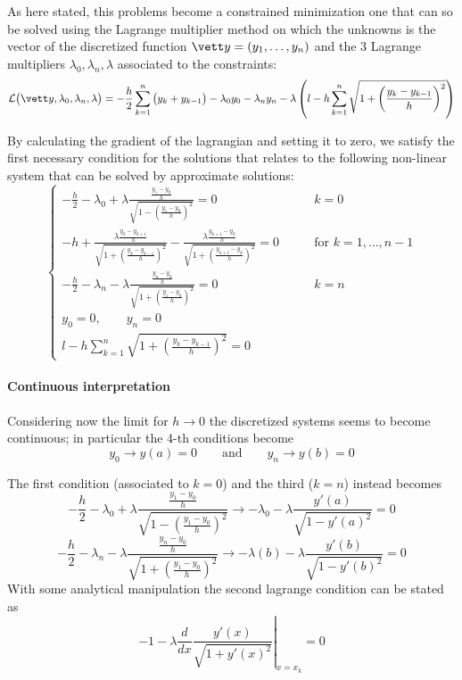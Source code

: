 As here stated, this problems become a constrained minimization one that can so be solved using the Lagrange multiplier method on which the unknowns is the vector of the discretized function $\vett y = (y_1,\dots, y_n)$ and the 3 Lagrange multipliers $\lambda_0,\lambda_n,\lambda$ associated to the constraints:
\[ \mathcal L \big(\vett y,\lambda_0,\lambda_n,\lambda\big) = - \frac h 2 \sum_{k=1}^{n} \big(y_k + y_{k-1}\big) - \lambda_0y_0 - \lambda_ny_n - \lambda \left( l - h \sum_{k=1}^{n} \sqrt{1 + \left( \frac{y_k - y_{k-1}}{h} \right)^2} \right) \]

By calculating the gradient of the lagrangian and setting it to zero, we satisfy the first necessary condition for the solutions that relates to the following non-linear system that can be solved by approximate solutions:
\[ \begin{cases}
	- \frac{h}{2} - \lambda_0 + \lambda \frac{ \frac{y_1-y_0}{h} }{\sqrt{1- \left( \frac{y_1-y_0}{h} \right)^2}} = 0 & k = 0 \\
	-h + \frac{\lambda \frac{y_k-y_{k+1}}{h}}{\sqrt{1+\left( \frac{y_k - y_{k-1}}{h} \right)^2}} - \frac{\lambda \frac{y_{k+1}-y_{k}}{h}}{\sqrt{1+\left( \frac{y_{k+1} - y_{k}}{h} \right)^2}} = 0 \qquad& \textrm{for } k = 1,\dots,n-1 \\
	- \frac h 2 - \lambda_n - \lambda \frac{\frac{y_n - y_0}{h}}{\sqrt{1 + \left( \frac{y_1-y_0}{h} \right)^2}} = 0 & k = n \\
	y_0 = 0,\qquad y_n = 0 \\ 
	l-h\sum_{k=1}^{n} \sqrt{1 + \left( \frac{y_k - y_{k-1}}{h} \right)^2} = 0
\end{cases} \]

\paragraph{Continuous interpretation} Considering now the limit for $h\rightarrow 0$ the discretized systems seems to become continuous; in particular the 4-th conditions become
\[ y_0 \rightarrow y(a) = 0 \qquad \textrm{and} \qquad y_n \rightarrow y(b) = 0 \]

The first condition (associated to $k=0$) and the third ($k = n$) instead becomes
\[ - \frac{h}{2} - \lambda_0 + \lambda \frac{ \frac{y_1-y_0}{h} }{\sqrt{1- \left( \frac{y_1-y_0}{h} \right)^2}} \rightarrow - \lambda_0 - \lambda \frac{y'(a)}{\sqrt{1-y'(a)^2}} = 0  \]
\[ - \frac h 2 - \lambda_n - \lambda \frac{\frac{y_n - y_0}{h}}{\sqrt{1 + \left( \frac{y_1-y_0}{h} \right)^2}} \rightarrow  - \lambda(b) - \lambda \frac{y'(b)}{\sqrt{1-y'(b)^2}} = 0 \]
With some analytical manipulation the second lagrange condition can be stated as
\[ - 1 - \lambda \frac{d}{dx} \left. \frac{y'(x)}{\sqrt{1+y'(x)^2}} \right|_{x=x_k} = 0  \]

